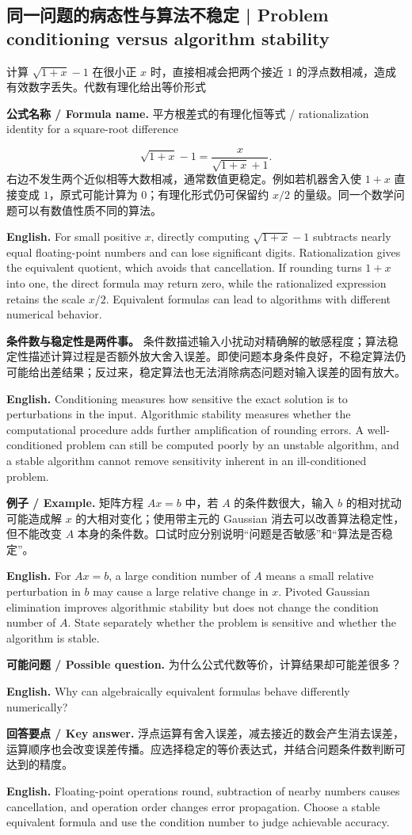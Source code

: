 \documentclass[UTF8,11pt,a4paper]{ctexart}
\newcommand{\EN}[1]{\par\noindent\textbf{English.} #1\par}
\newcommand{\FORMULA}[2]{\par\noindent\textbf{公式名称 / Formula name.} #1 / #2\par}
\newcommand{\EX}[2]{\par\noindent\textbf{例子 / Example.} #1\par\EN{#2}}
\newcommand{\ASK}[4]{\par\noindent\textbf{可能问题 / Possible question.} #1\par\EN{#2}\noindent\textbf{回答要点 / Key answer.} #3\par\EN{#4}\medskip}
\begin{document}
\subsection{同一问题的病态性与算法不稳定 | Problem conditioning versus algorithm stability}
\noindent 计算 $\sqrt{1+x}-1$ 在很小正 $x$ 时，直接相减会把两个接近 $1$ 的浮点数相减，造成有效数字丢失。代数有理化给出等价形式
\FORMULA{平方根差式的有理化恒等式}{rationalization identity for a square-root difference}
\[
\sqrt{1+x}-1=\frac{x}{\sqrt{1+x}+1}.
\]
右边不发生两个近似相等大数相减，通常数值更稳定。例如若机器舍入使 $1+x$ 直接变成 $1$，原式可能计算为 $0$；有理化形式仍可保留约 $x/2$ 的量级。同一个数学问题可以有数值性质不同的算法。
\EN{For small positive $x$, directly computing $\sqrt{1+x}-1$ subtracts nearly equal floating-point numbers and can lose significant digits. Rationalization gives the equivalent quotient, which avoids that cancellation. If rounding turns $1+x$ into one, the direct formula may return zero, while the rationalized expression retains the scale $x/2$. Equivalent formulas can lead to algorithms with different numerical behavior.}
\noindent \textbf{条件数与稳定性是两件事。} 条件数描述输入小扰动对精确解的敏感程度；算法稳定性描述计算过程是否额外放大舍入误差。即使问题本身条件良好，不稳定算法仍可能给出差结果；反过来，稳定算法也无法消除病态问题对输入误差的固有放大。
\EN{Conditioning measures how sensitive the exact solution is to perturbations in the input. Algorithmic stability measures whether the computational procedure adds further amplification of rounding errors. A well-conditioned problem can still be computed poorly by an unstable algorithm, and a stable algorithm cannot remove sensitivity inherent in an ill-conditioned problem.}
\EX{矩阵方程 $Ax=b$ 中，若 $A$ 的条件数很大，输入 $b$ 的相对扰动可能造成解 $x$ 的大相对变化；使用带主元的 Gaussian 消去可以改善算法稳定性，但不能改变 $A$ 本身的条件数。口试时应分别说明“问题是否敏感”和“算法是否稳定”。}{For $Ax=b$, a large condition number of $A$ means a small relative perturbation in $b$ may cause a large relative change in $x$. Pivoted Gaussian elimination improves algorithmic stability but does not change the condition number of $A$. State separately whether the problem is sensitive and whether the algorithm is stable.}
\ASK{为什么公式代数等价，计算结果却可能差很多？}{Why can algebraically equivalent formulas behave differently numerically?}{浮点运算有舍入误差，减去接近的数会产生消去误差，运算顺序也会改变误差传播。应选择稳定的等价表达式，并结合问题条件数判断可达到的精度。}{Floating-point operations round, subtraction of nearby numbers causes cancellation, and operation order changes error propagation. Choose a stable equivalent formula and use the condition number to judge achievable accuracy.}
\end{document}
